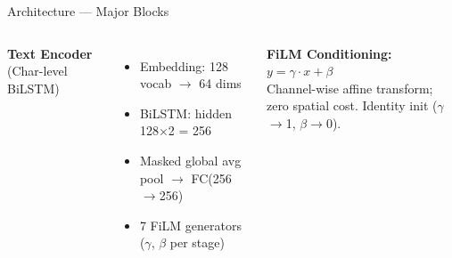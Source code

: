 \documentclass[aspectratio=169, 10pt]{beamer}
\begin{document}
\begin{frame}{Architecture --- Major Blocks}
\begin{columns}[T]
\medskip
\textbf{Text Encoder} (Char-level BiLSTM)
\begin{itemize}
  \item Embedding: 128 vocab $\to$ 64 dims
  \item BiLSTM: hidden 128$\times$2 = 256
  \item Masked global avg pool $\to$ FC(256$\to$256)
  \item 7 FiLM generators ($\gamma$, $\beta$ per stage)
\end{itemize}

\medskip
\textbf{FiLM Conditioning:} $y = \gamma \cdot x + \beta$\\
Channel-wise affine transform; zero spatial cost.
Identity init ($\gamma$$\to$1, $\beta$$\to$0).

\end{columns}
\end{frame}
\end{document}
